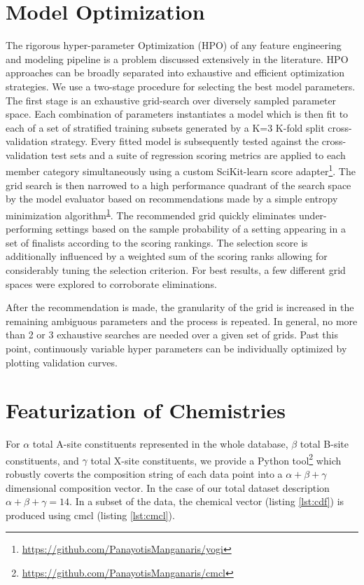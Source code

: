 \section{Model Optimization}
\label{sec:org8f9180a}
The rigorous hyper-parameter Optimization (HPO) of any feature engineering and modeling pipeline is a problem discussed extensively in the literature.
HPO approaches can be broadly separated into exhaustive and efficient optimization strategies.
\autocite{yang-2020-hyper-optim}
We use a two-stage procedure for selecting the best model parameters.
The first stage is an exhaustive grid-search over diversely sampled parameter space.
Each combination of parameters instantiates a model which is then fit to each of a set of stratified training subsets generated by a K=3 K-fold split cross-validation strategy.
Every fitted model is subsequently tested against the cross-validation test sets and a suite of regression scoring metrics are applied to each member category simultaneously using a custom SciKit-learn score adapter\footnote{\url{https://github.com/PanayotisManganaris/yogi}\label{org39fba7e}}.
The grid search is then narrowed to a high performance quadrant of the search space by the model evaluator based on recommendations made by a simple entropy minimization algorithm\textsuperscript{\ref{org39fba7e}}.
The recommended grid quickly eliminates under-performing settings based on the sample probability of a setting appearing in a set of finalists according to the scoring rankings.
The selection score is additionally influenced by a weighted sum of the scoring ranks allowing for considerably tuning the selection criterion.
For best results, a few different grid spaces were explored to corroborate eliminations.

After the recommendation is made, the granularity of the grid is increased in the remaining ambiguous parameters and the process is repeated.
In general, no more than 2 or 3 exhaustive searches are needed over a given set of grids.
Past this point, continuously variable hyper parameters can be individually optimized by plotting validation curves.

\section{Featurization of Chemistries}
\label{sec:orgd1d9e75}
For \(\alpha\) total A-site constituents represented in the whole database, \(\beta\) total B-site constituents, and \(\gamma\) total X-site constituents, we provide a Python tool\footnote{\url{https://github.com/PanayotisManganaris/cmcl}\label{orge54c147}} which robustly coverts the composition string of each data point into a \(\alpha + \beta + \gamma\) dimensional composition vector.
In the case of our total dataset description \(\alpha + \beta + \gamma = 14\).
\autocite{yang-2022-high-throug}
In a subset of the data, the chemical vector (listing \ref{lst:cdf}) is produced using cmcl (listing \ref{lst:cmcl}).

